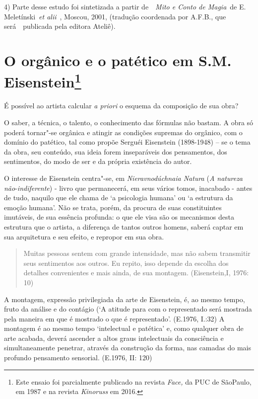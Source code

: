 4) Parte desse estudo foi sintetizada a partir de~~\emph{Mito e Conto de
Magia}~de E. Meletínski~\emph{et alii}~, Moscou, 2001, (tradução
coordenada por A.F.B., que será~~publicada pela editora Ateliê).

\chapter{O orgânico e o patético em S.M. Eisenstein\footnote{Este ensaio
  foi parcialmente publicado na revista \emph{Face,} da PUC de SãoPaulo,
  em 1987 e na revista \emph{Kinoruss} em 2016.}}

É possível ao artista calcular \emph{a priori} o esquema da composição
de sua obra?

O saber, a técnica, o talento, o conhecimento das fórmulas não bastam. A
obra só poderá tornar"-se orgânica e atingir as condições supremas do
orgânico, com o domínio do patético, tal como propõe Serguéi Eisenstein
(1898-1948) -- se o tema da obra, seu conteúdo, sua ideia forem
inseparáveis dos pensamentos, dos sentimentos, do modo de ser e da
própria existência do autor.

O interesse de Eisenstein centra"-se, em \emph{Nieravnodúchnaia Natura}
(\emph{A natureza não}-\emph{indiferente}) - livro que permanecerá, em
seus vários tomos, inacabado - antes de tudo, naquilo que ele chama de
`a psicologia humana' ou `a estrutura da emoção humana'. Não se trata,
porém, da procura de suas constituintes imutáveis, de sua essência
profunda: o que ele visa são os mecanismos desta estrutura que o
artista, a diferença de tantos outros homens, saberá captar em sua
arquitetura e seu efeito, e repropor em sua obra.

\begin{quote}
Muitas pessoas sentem com grande intensidade, mas não sabem transmitir
seus sentimentos aos outros. Eu repito, isso depende da escolha dos
detalhes convenientes e mais ainda, de sua montagem. (Eisenstein,I,
1976: 10)
\end{quote}

A montagem, expressão privilegiada da arte de Eisenstein, é, ao mesmo
tempo, fruto da análise e do contágio (`A atitude para com o
representado será mostrada pela maneira em que é mostrado o que é
representado'. (E.1976, I.:32) A montagem é ao mesmo tempo `intelectual
e patética' e, como qualquer obra de arte acabada, deverá ascender a
altos graus intelectuais da consciência e simultaneamente penetrar,
através da construção da forma, nas camadas do mais profundo pensamento
sensorial. (E.1976, II: 120)

